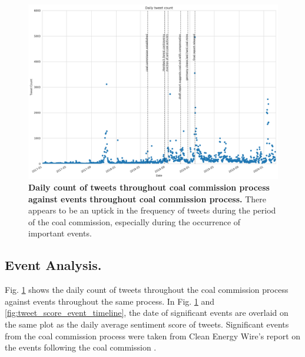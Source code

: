 \documentclass[12pt,onecolumn,twoside]{layout}
\begin{document}
\begin{figure}
	\begin{center}
		\includegraphics[width=\textwidth]{figures/sa_tweet_count_event_timeline3}
	\end{center}
	\caption{\textbf{Daily count of tweets throughout coal commission process against events throughout coal commission process.} There appears to be an uptick in the frequency of tweets during the period of the coal commission, especially during the occurrence of important events.}
	\label{fig:tweet_count_event_timeline}
\end{figure}


\subsection*{Event Analysis.}
Fig. \ref{fig:tweet_count_event_timeline} shows the daily count of tweets throughout the coal commission process against events throughout the same process. In Fig. \ref{fig:tweet_count_event_timeline} and \ref{fig:tweet_score_event_timeline}, the date of significant events are overlaid on the same plot as the daily average sentiment score of tweets. Significant events from the coal commission process were taken from Clean Energy Wire's report on the events following the coal commission \citep{Amelang2019}.
\end{document}
